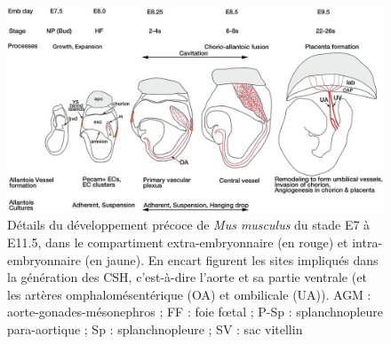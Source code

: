 \documentclass[fleqn,11pt]{SelfArx} %
\begin{document}
\begin{figure}[ht]
\centering
\includegraphics[width=\linewidth]{images/devpt}
\caption{Détails du développement précoce de \textit{Mus musculus}\href{http://www.ipubli.inserm.fr/handle/10608/6217}{\cite{Gaudin}} du stade E7 à E11.5, dans le compartiment extra-embryonnaire (en rouge) et intra-embryonnaire (en jaune). En encart figurent les sites impliqués dans la génération des CSH, c’est-à-dire l’aorte et sa partie ventrale (et les artères omphalomésentérique (OA) et ombilicale (UA)). AGM : aorte-gonades-mésonephros ; FF : foie fœtal ; P-Sp : splanchnopleure para-aortique ; Sp : splanchnopleure ; SV : sac vitellin}
\label{fig:devpt}
\end{figure}







%
\end{document}

